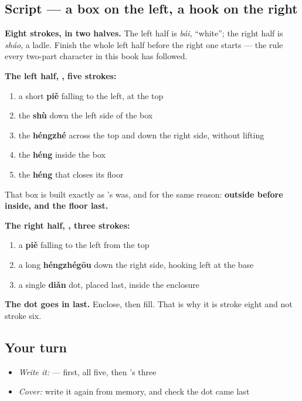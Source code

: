\subsection*{Script — a box on the left, a hook on the right}

\begin{quote}
\end{quote}

\textbf{Eight strokes, in two halves.} The left half is  \emph{bái}, \textquotedblleft{}white\textquotedblright{}; the right half is  \emph{sháo}, a ladle. Finish the whole left half before the right one starts — the rule every two-part character in this book has followed.

\textbf{The left half, , five strokes:}

\begin{enumerate}
\raggedright
  \item a short \textbf{piě} falling to the left, at the top
  \item the \textbf{shù} down the left side of the box
  \item the \textbf{héngzhé} across the top and down the right side, without lifting
  \item the \textbf{héng} inside the box
  \item the \textbf{héng} that closes its floor
\end{enumerate}

That box is built exactly as 's was, and for the same reason: \textbf{outside before inside, and the floor last.}

\textbf{The right half, , three strokes:}

\begin{enumerate}
\raggedright
  \item a \textbf{piě} falling to the left from the top
  \item a long \textbf{héngzhégōu} down the right side, hooking left at the base
  \item a single \textbf{diǎn} dot, placed last, inside the enclosure
\end{enumerate}

\textbf{The dot goes in last.} Enclose, then fill. That is why it is stroke eight and not stroke six.

\subsection*{Your turn}
\begin{itemize}
\raggedright
  \item \emph{Write it:}  —  first, all five, then 's three
  \item \emph{Cover:} write it again from memory, and check the dot came last
\end{itemize}

